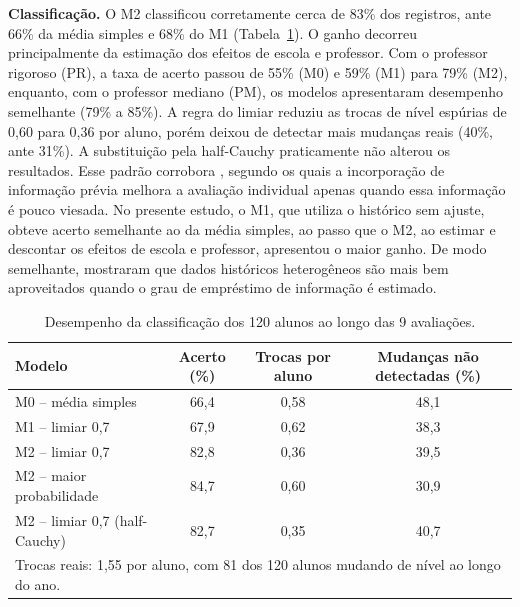 \documentclass[12pt,a4paper]{article}
\begin{document}
\textbf{Classificação.} O M2 classificou corretamente cerca de 83\% dos registros, ante 66\%
da média simples e 68\% do M1 (Tabela~\ref{tab:modelos}). O ganho decorreu principalmente da
estimação dos efeitos de escola e professor. Com o professor rigoroso (PR), a taxa de acerto
passou de 55\% (M0) e 59\% (M1) para 79\% (M2), enquanto, com o professor mediano (PM), os
modelos apresentaram desempenho semelhante (79\% a 85\%). A regra do limiar reduziu as trocas
de nível espúrias de 0,60 para 0,36 por aluno, porém deixou de detectar mais mudanças reais
(40\%, ante 31\%). A substituição pela half-Cauchy praticamente não alterou os resultados.
Esse padrão corrobora \citet{zitzmann2025}, segundo os quais a incorporação de informação
prévia melhora a avaliação individual apenas quando essa informação é pouco viesada. No
presente estudo, o M1, que utiliza o histórico sem ajuste, obteve acerto semelhante ao da
média simples, ao passo que o M2, ao estimar e descontar os efeitos de escola e professor,
apresentou o maior ganho. De modo semelhante, \citet{kaplan2023} mostraram que dados
históricos heterogêneos são mais bem aproveitados quando o grau de empréstimo de informação é
estimado.

\begin{table}[h]
  \centering
  \caption{Desempenho da classificação dos 120 alunos ao longo das 9 avaliações.}
  \label{tab:modelos}
  \small
  \begin{tabular}{lccc}
    \toprule
    Modelo & Acerto (\%) & Trocas por aluno & Mudanças não detectadas (\%) \\
    \midrule
    M0 -- média simples              & 66,4 & 0,58 & 48,1 \\
    M1 -- limiar 0,7                 & 67,9 & 0,62 & 38,3 \\
    M2 -- limiar 0,7                 & 82,8 & 0,36 & 39,5 \\
    M2 -- maior probabilidade        & 84,7 & 0,60 & 30,9 \\
    M2 -- limiar 0,7 (half-Cauchy)   & 82,7 & 0,35 & 40,7 \\
    \bottomrule
    \multicolumn{4}{l}{\footnotesize Trocas reais: 1,55 por aluno, com 81 dos 120 alunos mudando de nível ao longo do ano.}
  \end{tabular}
\end{table}
\end{document}
